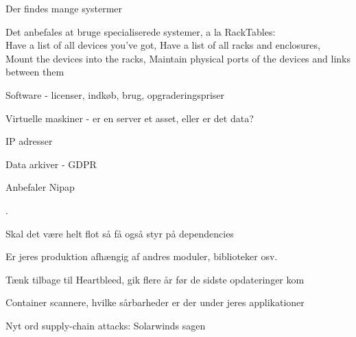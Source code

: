 \documentclass[Screen16to9,17pt]{foils}
\begin{document}


\begin{list2}
\item Der findes mange systermer
\item Det anbefales at bruge specialiserede systemer, a la RackTables:\\
Have a list of all devices you've got,
Have a list of all racks and enclosures,
Mount the devices into the racks,
Maintain physical ports of the devices and links between them
\end{list2}



\begin{list2}
\item Software - licenser, indkøb, brug, opgraderingspriser
\item Virtuelle maskiner - er en server et asset, eller er det data?
\item IP adresser
\item Data arkiver - GDPR
\end{list2}


\begin{list2}
\item Anbefaler Nipap 
\end{list2}


.

\begin{list2}
\item Skal det være helt flot så få også styr på dependencies
\item Er jeres produktion afhængig af andres moduler, biblioteker osv.
\item Tænk tilbage til Heartbleed, gik flere år før de sidste opdateringer kom
\item Container scannere, hvilke sårbarheder er der under jeres applikationer
\item Nyt ord supply-chain attacks: Solarwinds sagen
\end{list2}
\end{document}
